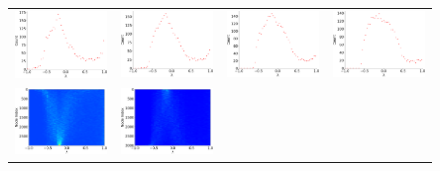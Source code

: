 \documentclass[senior,final,11pt]{iscs-thesis}
\begin{document}
\begin{figure}[htbp]
  \setlength\tabcolsep{0pt}
  \hspace{-3.0cm}
  \begin{tabular}{cccc}
    \includegraphics[width=45mm]{figure/scale-free_geometric_3000_5_000txt_dos.png} &
    \includegraphics[width=45mm]{figure/scale-free_geometric_3000_5_002txt_dos.png} &
    \includegraphics[width=45mm]{figure/scale-free_geometric_3000_5_004txt_dos.png} &
    \includegraphics[width=45mm]{figure/scale-free_geometric_3000_5_006txt_dos.png} \\
    \includegraphics[width=45mm]{figure/scale-free_geometric_3000_5_000txt_pdos.png} &
    \includegraphics[width=45mm]{figure/scale-free_geometric_3000_5_002txt_pdos.png} &

\end{tabular}
\end{figure}
\end{document}
